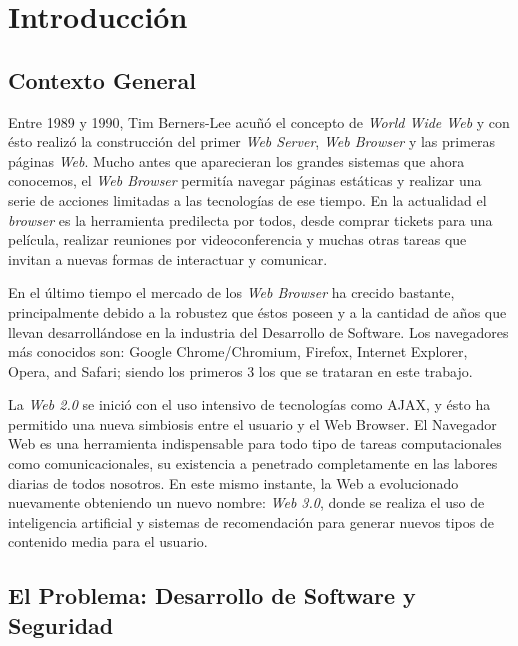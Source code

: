 


\chapter{Introducción}
\label{chap1:intro}

\section{Contexto General}
\label{chap1:CG}

Entre 1989 y 1990, Tim Berners-Lee acuñó el concepto de \textit{World Wide Web} y con ésto realizó la construcción del primer \textit{Web Server}, \textit{Web Browser} y las primeras páginas \textit{Web}. Mucho antes que aparecieran los grandes sistemas que ahora conocemos, el \textit{Web Browser} permitía navegar páginas estáticas y realizar una serie de acciones limitadas a las tecnologías de ese tiempo. En la actualidad el \textit{browser} es la herramienta predilecta por todos, desde comprar tickets para una película, realizar reuniones por videoconferencia y muchas otras tareas que invitan a nuevas formas de interactuar y comunicar.

En el último tiempo el mercado de los \textit{Web Browser} ha crecido bastante, principalmente debido a la robustez que éstos poseen y a la cantidad de años que llevan desarrollándose en la industria del Desarrollo de Software. Los navegadores más conocidos son: Google Chrome/Chromium, Firefox, Internet Explorer, Opera, and Safari; siendo los primeros 3 los que se trataran en este trabajo.

La \textit{Web 2.0} se inició con el uso intensivo de tecnologías como AJAX, y ésto ha permitido una nueva simbiosis entre el usuario y el Web Browser. El Navegador Web es una herramienta indispensable para todo tipo de tareas computacionales como comunicacionales, su existencia a penetrado completamente en las labores diarias de todos nosotros. En este mismo instante, la Web a evolucionado nuevamente obteniendo un nuevo nombre: \textit{Web 3.0}, donde se realiza el uso de inteligencia artificial y sistemas de recomendación para generar nuevos tipos de contenido media para el usuario.


\section{El Problema: Desarrollo de Software y Seguridad}
\label{chap1:SD_SS}

